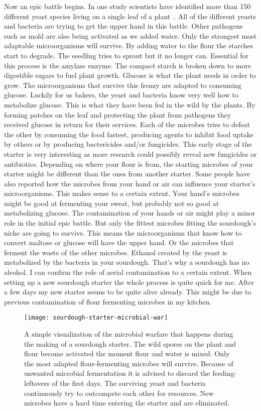 Now an epic battle begins. In one study scientists
have identified more than 150 different yeast species living
on a single leaf of a plant~\cite{yeasts+biocontrol+agent}.
All of the different yeasts and bacteria are trying to get
the upper hand in this battle. Other pathogens such as mold
are also being activated as we added water. Only the strongest
most adaptable microorganisms will survive. By adding water to the
flour the starches start to degrade. The seedling tries to
sprout but it no longer can. Essential for this process is the
amylase enzyme. The compact starch is broken down to more
digestible sugars to fuel plant growth. Glucose is what the
plant needs in order to grow. The microorganisms that survive
this frenzy are adapted to consuming glucose. Luckily for us
bakers, the yeast and bacteria know very well how to metabolize
glucose. This is what they have been fed in the wild by the plants.
By forming patches on the leaf and protecting the plant from
pathogens they received glucose in return for their services.
Each of the microbes tries to defeat the other by consuming the
food fastest, producing agents to inhibit food uptake by others or by producing
bactericides and/or fungicides. This early stage of the starter
is very interesting as more research could possibly reveal
new fungicides or antibiotics. Depending on where your flour
is from, the starting microbes of your starter might be different
than the ones from another starter. Some people have also reported
how the microbes from your hand or air can influence your starter's
microorganisms. This makes sense to a certain extent. Your
hand's microbes might be good at fermenting your sweat, but
probably not so good at metabolizing glucose. The contamination
of your hands or air might play a minor role in the initial epic
battle. But only the fittest microbes fitting the sourdough's
niche are going to survive. This means the microorganisms that know
how to convert maltose or glucose will have the upper hand. Or the
microbes that ferment the waste of the other microbes. Ethanol created
by the yeast is metabolized by the bacteria in your sourdough. That's
why a sourdough has no alcohol. I can confirm the role of aerial
contamination to a certain extent. When setting up a new sourdough
starter the whole process is quite quick for me. After a few
days my new starter seems to be quite alive already. This might
be due to previous contamination of flour fermenting microbes in
my kitchen.

\begin{figure}[!htb]
  \texttt{[image: sourdough-starter-microbial-war]}
  \caption{A simple visualization of the microbial warfare that happens during the making of a sourdough starter. The
  wild spores on the plant and flour become activated the moment flour and water is mixed.
  Only the most adapted flour-fermenting microbes will survive. Because of unwanted microbial fermentation it is advised
  to discard the feeding-leftovers of the first days. The surviving yeast and bacteria continuously try to
  outcompete each other for resources. New microbes have a hard time entering the starter and are eliminated.
  }
  \label{fig:sourdough-starter-microbial-war}
\end{figure}


